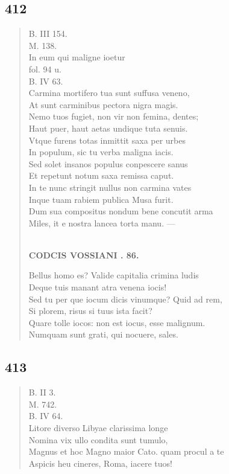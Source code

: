 \documentclass[11pt, a4paper]{report}
\begin{document}
            \subsection*{412}
      \begin{verse}
      B. III 154. \\ M. 138. \\ In eum qui maligne ioetur \\ fol. 94 u. \\ B. IV 63. \\ Carmina mortifero tua sunt suffusa veneno, \\ At sunt carminibus pectora nigra magis. \\ Nemo tuos fugiet, non vir non femina, dentes; \\ Haut puer, haut aetas undique tuta senuis. \\ Vtque furens totas inmittit saxa per urbes \\ In populum, sic tu verba maligna iacis. \\ Sed solet insanos populus conpescere sanus \\ Et repetunt notum saxa remissa caput. \\ In te nunc stringit nullus non carmina vates \\ Inque tuam rabiem publica Musa furit. \\ Dum sua compositus nondum bene concutit arma \\ Miles, it e nostra lancea torta manu. — \\ 
        ﻿\pagebreak 
    \begin{center} \textbf{CODCIS VOSSIANI . 86.} \end{center} \marginpar{[319]} Bellus homo es? Valide capitalia crimina ludis \\ Deque tuis manant atra venena iocis! \\ Sed tu per \lbrack que iocum dicis vinumque? Quid ad rem, \\ Si plorem, risus si tuus ista facit? \\ Quare tolle iocos: non est iocus, esse malignum. \\ Numquam sunt grati, qui nocuere, sales. \\ 
      \end{verse}
  
            \subsection*{413}
      \begin{verse}
      B. II 3. \\ M. 742. \\ B. IV 64. \\ Litore diverso Libyae clarissima longe \\ Nomina vix ullo condita sunt tumulo, \\ Magnus et hoc Magno maior Cato. quam procul a te \\ Aspicis heu cineres, Roma, iacere tuos! \\ 
      \end{verse}
  
\end{document}
